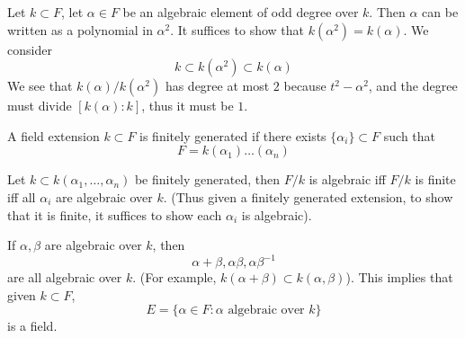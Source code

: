 \documentclass[openany]{book}
\begin{document}
\begin{example}
    Let $k\subset F$, let $\alpha\in F$ be an algebraic element of odd degree over $k$. Then $\alpha$ can be written as a polynomial in $\alpha^2$. It suffices to show that $k(\alpha^2)=k(\alpha)$. We consider 
    \begin{equation*}
        k\subset k(\alpha^2)\subset k(\alpha)
    \end{equation*}
    We see that $k(\alpha)/k(\alpha^2)$ has degree at most $2$ because $t^2-\alpha^2$, and the degree must divide $[k(\alpha):k]$, thus it must be $1$.
\end{example}


\begin{defn}
    A field extension $k\subset F$  is finitely generated if there exists $\{\alpha_i\}\subset F$ such that 
    \begin{equation*}
        F=k(\alpha_1)\dots(\alpha_n)
    \end{equation*}
\end{defn}


\begin{prop}
    Let $k\subset k(\alpha_1,\dots,\alpha_n)$ be finitely generated, then
    $F/k$ is algebraic iff $F/k$ is finite iff all $\alpha_i$ are algebraic over $k$. (Thus given a finitely generated extension, to show that it is finite, it suffices to show each $\alpha_i$ is algebraic).
\end{prop}

\begin{prop}
    If $\alpha,\beta$ are algebraic over $k$, then 
    \begin{equation*}
        \alpha+\beta, \alpha\beta, \alpha\beta^{-1}
    \end{equation*}
    are all algebraic over $k$. (For example, $k(\alpha+\beta)\subset k(\alpha,\beta)$). This implies that given $k\subset F$, 
    \begin{equation*}
        E=\{\alpha\in F: \alpha \text{ algebraic over }k \}
    \end{equation*}
    is a field.
\end{prop}



\end{document}
